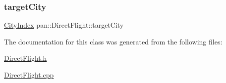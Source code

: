 \mbox{\label{classpan_1_1_direct_flight_a6781e6dab81c55f2ed96352cad0c793d}} 
\subsubsection{\texorpdfstring{target\+City}{targetCity}}
{\footnotesize\ttfamily \hyperlink{namespacepan_afaed28aa6603153dcc062a028602d697}{City\+Index} pan\+::\+Direct\+Flight\+::target\+City}



The documentation for this class was generated from the following files\+:\begin{DoxyCompactItemize}
\item 
\hyperlink{_direct_flight_8h}{Direct\+Flight.\+h}\item 
\hyperlink{_direct_flight_8cpp}{Direct\+Flight.\+cpp}\end{DoxyCompactItemize}
